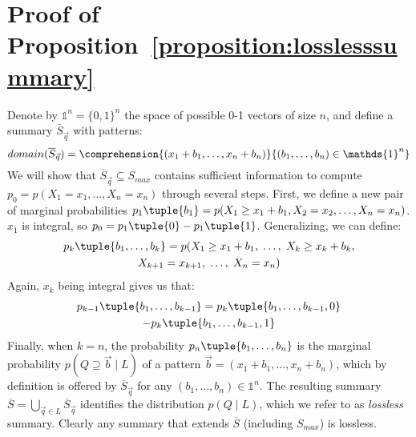 \section{Proof of Proposition~\ref{proposition:losslesssummary}}
\label{appendix:losslesssummary}
Denote by $\mathds{1}^n = \{0,1\}^n$ the space of possible 0-1 vectors of size $n$, and define a summary $\bar S_{\vec{q}}$ with patterns:
$$domain(\overline{S}_{\vec{q}})=\comprehension{(x_1+b_1,\ldots,x_n+b_n)}{(b_1,\ldots,b_n)\in\mathds{1}^n}$$
We will show that $\overline{S}_{\vec{q}}\subseteq S_{max}$ contains sufficient information to compute $p_0 = p(X_1=x_1,\ldots,X_n=x_n)$ through several steps.
First, we define a new pair of marginal probabilities $p_1\tuple{b_1} = p(X_1 \geq x_1 + b_1,X_2=x_2,\ldots,X_n=x_n)$.
$x_1$ is integral, so $p_0 = p_1\tuple{0} - p_1\tuple{1}$.
Generalizing, we can define:
\begin{multline*}
p_k\tuple{b_1, \ldots, b_k} = p(X_1 \geq x_1 + b_1,\; \ldots,\; X_k \geq x_k + b_k, \\
  X_{k+1} = x_{k+1},\; \ldots,\; X_n=x_n)
\end{multline*}
Again, $x_k$ being integral gives us that:
\begin{multline*}
p_{k-1}\tuple{b_1, \ldots, b_{k-1}} = p_{k}\tuple{b_1, \ldots, b_{k-1}, 0} \\
  -p_{k}\tuple{b_1, \ldots, b_{k-1}, 1}
\end{multline*}
Finally, when $k = n$, the probability $p_n\tuple{b_1, \ldots, b_n}$ is the marginal probability $p(Q\supseteq\vec{b}\;|\;L)$ of a pattern $\vec{b}=(x_1+b_1, \ldots, x_n+b_n)$, which by definition is offered by $\overline{S}_{\vec{q}}$ for any $(b_1, \ldots, b_n) \in \mathds{1}^n$.
The resulting summary $\overline{S}=\bigcup_{\vec{q}\in L}\overline{S}_{\vec{q}}$ identifies the distribution $p(Q\;|\;L)$, which we refer to as \emph{lossless} summary. Clearly any summary that extends $\overline{S}$ (including $S_{max}$) is lossless.

